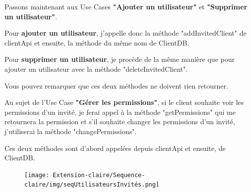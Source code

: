 \begin{flushleft}
Passons maintenant aux Use Cases \textbf{"Ajouter un utilisateur"} et \textbf{"Supprimer un utilisateur"}.
\end{flushleft}

\begin{flushleft}
Pour \textbf{ajouter un utilisateur}, j'appelle donc la méthode "addInvitedClient" de clientApi et ensuite, la méthode du même nom de ClientDB.
\end{flushleft}

\begin{flushleft}
Pour \textbf{supprimer un utilisateur}, je procède de la même manière que pour ajouter un utilisateur avec la méthode "deleteInvitedClient".
\end{flushleft}

\begin{flushleft}
Vous pouvez remarquer que ces deux méthodes ne doivent rien retourner.
\end{flushleft}

\begin{flushleft}
Au sujet de l'Use Case \textbf{"Gérer les permissions"}, si le client souhaite voir les permissions d'un invité, je ferai appel à la méthode "getPermissions" qui me retournera la permission et s'il souhaite changer les permissions d'un invité, j'utiliserai la méthode "changePermissions".
\end{flushleft}

\begin{flushleft}
Ces deux méthodes sont d'abord appelées depuis clientApi et ensuite, de ClientDB.
\end{flushleft}

\newpage
\begin{figure}[h]
\centering
\texttt{[image: Extension-claire/Sequence-claire/img/seqUtilisateursInvités.png]}
\end{figure}